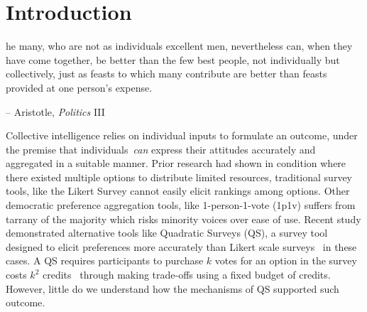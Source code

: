 \section{Introduction}

\begin{displayquote}
[T]he many, who are not as individuals excellent men, nevertheless can, when they have come together, be better than the few best people, not individually but collectively, just as feasts to which many contribute are better than feasts provided at one person's expense.

\begin{flushright}
-- Aristotle, \textit{Politics} III
\end{flushright}
\end{displayquote}

Collective intelligence relies on individual inputs to formulate an outcome, under the premise that individuals~\textit{can} express their attitudes accurately and aggregated in a suitable manner. Prior research had shown in condition where there existed multiple options to distribute limited resources, traditional survey tools, like the Likert Survey cannot easily elicit rankings among options. Other democratic preference aggregation tools, like 1-person-1-vote (1p1v) suffers from tarrany of the majority which risks minority voices over ease of use. Recent study demonstrated alternative tools like Quadratic Surveys (QS), a survey tool designed to elicit preferences more accurately than Likert scale surveys~\cite{chengCanShowWhat2021, quarfoot2017quadratic, cavaille2024cares} in these cases. A QS requires participants to purchase $k$ votes for an option in the survey costs $k^2$ credits~\cite{quarfoot2017quadratic,chengCanShowWhat2021} through making trade-offs using a fixed budget of credits. However, little do we understand how the mechanisms of QS supported such outcome.


